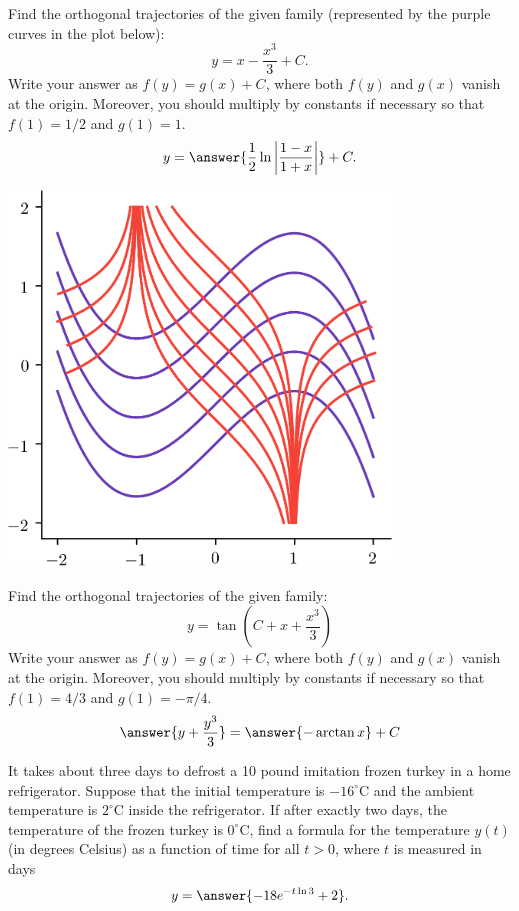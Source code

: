 \documentclass{ximera}
\begin{document}
\begin{exercise}
Find the orthogonal trajectories of the given family (represented by the purple curves in the plot below):
\[ y = x - \frac{x^3}{3} + C. \]
Write your answer as $f(y) = g(x) + C$, where both $f(y)$ and $g(x)$ vanish at the origin. Moreover, you should multiply by constants if necessary so that $f(1) = 1/2$ and $g(1) = 1$. 
\[ y = \answer{\frac{1}{2} \ln \left| \frac{1-x}{1+x} \right|} + C. \]
\begin{center}
\begin{image}
\includegraphics[width=4in]{images/ortho02.png}
\end{image}
\end{center}

\end{exercise}

\begin{exercise}
Find the orthogonal trajectories of the given family:
\[ y = \tan \left( C + x + \frac{x^3}{3} \right) \]
Write your answer as $f(y) = g(x) + C$, where both $f(y)$ and $g(x)$ vanish at the origin. Moreover, you should multiply by constants if necessary so that $f(1) = 4/3$ and $g(1) = -\pi/4$.
\[ \answer{y + \frac{y^3}{3}} = \answer{- \arctan x} + C \]
\end{exercise}



\begin{exercise}
It takes about three days to defrost a 10 pound imitation frozen turkey in a home refrigerator. Suppose that the initial temperature is $-16^\circ$C and the ambient temperature is $2^\circ$C inside the refrigerator. If after exactly two days, the temperature of the frozen turkey is $0^\circ$C, find a formula for the temperature $y(t)$ (in degrees Celsius) as a function of time for all $t > 0$, where $t$ is measured in days
\[ y = \answer{ -18 e^{-t \ln 3} + 2}. \]
\end{exercise}
\end{document}
